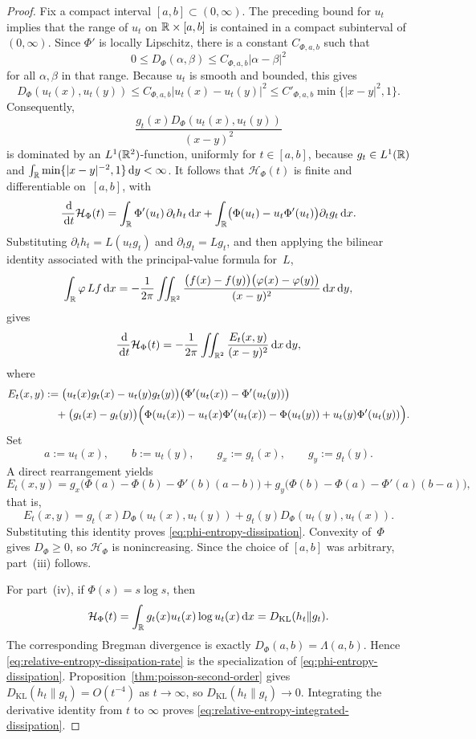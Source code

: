 \begin{proof}
Fix a compact interval $[a,b]\subset(0,\infty)$.  The preceding bound for
$u_t$ implies that the range of $u_t$ on $\mathbb{R}\times[a,b]$ is contained in
a compact subinterval of $(0,\infty)$.  Since $\Phi'$ is locally
Lipschitz, there is a constant $C_{\Phi,a,b}$ such that
\[
0\le D_\Phi(\alpha,\beta)\le C_{\Phi,a,b}|\alpha-\beta|^2
\]
for all $\alpha,\beta$ in that range.  Because $u_t$ is smooth and
bounded, this gives
\[
D_\Phi(u_t(x),u_t(y))
\le C_{\Phi,a,b}|u_t(x)-u_t(y)|^2
\le C'_{\Phi,a,b}\min\{|x-y|^2,1\}.
\]
Consequently,
\[
\frac{g_t(x)D_\Phi(u_t(x),u_t(y))}{(x-y)^2}
\]
is dominated by an $L^1(\mathbb{R}^2)$-function, uniformly for $t\in[a,b]$,
because $g_t\in L^1(\mathbb{R})$ and
$\int_{\mathbb{R}}\min\{|x-y|^{-2},1\}\,\mathrm{d} y<\infty$.  It follows that
$\mathcal H_\Phi(t)$ is finite and differentiable on~$[a,b]$, with
\[
\frac{\,\mathrm{d}}{\,\mathrm{d} t}\mathcal H_\Phi(t)
=
\int_{\mathbb{R}}\Phi'(u_t)\,\partial_th_t\,\mathrm{d} x
+
\int_{\mathbb{R}}\bigl(\Phi(u_t)-u_t\Phi'(u_t)\bigr)\partial_tg_t\,\mathrm{d} x.
\]
Substituting $\partial_th_t=L(u_tg_t)$ and $\partial_tg_t=Lg_t$, and then
applying the bilinear identity associated with the principal-value
formula for~$L$,
\[
\int_{\mathbb{R}}\varphi\,Lf\,\mathrm{d} x
=
-\frac{1}{2\pi}\iint_{\mathbb{R}^2}
\frac{\bigl(f(x)-f(y)\bigr)\bigl(\varphi(x)-\varphi(y)\bigr)}
{(x-y)^2}\,\mathrm{d} x\,\mathrm{d} y,
\]
gives
\[
\frac{\,\mathrm{d}}{\,\mathrm{d} t}\mathcal H_\Phi(t)
=
-\frac{1}{2\pi}\iint_{\mathbb{R}^2}
\frac{E_t(x,y)}{(x-y)^2}\,\mathrm{d} x\,\mathrm{d} y,
\]
where
\begin{align*}
E_t(x,y)
&:=
\bigl(u_t(x)g_t(x)-u_t(y)g_t(y)\bigr)
\bigl(\Phi'(u_t(x))-\Phi'(u_t(y))\bigr)
\\
&\quad
+\bigl(g_t(x)-g_t(y)\bigr)
\Bigl(
\Phi(u_t(x))-u_t(x)\Phi'(u_t(x))
-\Phi(u_t(y))+u_t(y)\Phi'(u_t(y))
\Bigr).
\end{align*}
Set
\[
a:=u_t(x),
\qquad
b:=u_t(y),
\qquad
g_x:=g_t(x),
\qquad
g_y:=g_t(y).
\]
A direct rearrangement yields
\[
E_t(x,y)
=g_x\bigl(\Phi(a)-\Phi(b)-\Phi'(b)(a-b)\bigr)
+g_y\bigl(\Phi(b)-\Phi(a)-\Phi'(a)(b-a)\bigr),
\]
that is,
\[
E_t(x,y)=g_t(x)D_\Phi(u_t(x),u_t(y))
+g_t(y)D_\Phi(u_t(y),u_t(x)).
\]
Substituting this identity proves
\eqref{eq:phi-entropy-dissipation}.  Convexity of~$\Phi$ gives
$D_\Phi\ge 0$, so $\mathcal H_\Phi$ is nonincreasing.  Since the choice
of $[a,b]$ was arbitrary, part~(iii) follows.

For part~(iv), if $\Phi(s)=s\log s$, then
\[
\mathcal H_\Phi(t)
=\int_{\mathbb{R}}g_t(x)u_t(x)\log u_t(x)\,\mathrm{d} x
=D_{\mathrm{KL}}(h_t\|g_t).
\]
The corresponding Bregman divergence is exactly
$D_\Phi(a,b)=\Lambda(a,b)$.  Hence
\eqref{eq:relative-entropy-dissipation-rate} is the specialization of
\eqref{eq:phi-entropy-dissipation}.  Proposition~\ref{thm:poisson-second-order}
gives $D_{\mathrm{KL}}(h_t\|g_t)=O(t^{-4})$ as $t\to\infty$, so
$D_{\mathrm{KL}}(h_t\|g_t)\to 0$.  Integrating the derivative identity from
$t$ to $\infty$ proves
\eqref{eq:relative-entropy-integrated-dissipation}.
\end{proof}

